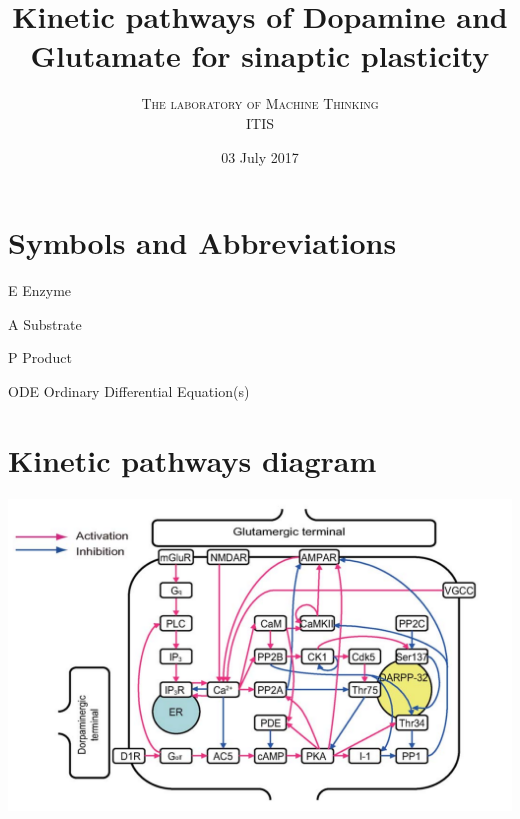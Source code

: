 \documentclass[twoside,twocolumn]{article}
\title{Kinetic pathways of Dopamine and Glutamate for sinaptic plasticity}
\author{
\textsc{The laboratory of Machine Thinking} \\[1ex]
\normalsize ITIS
}
\date{03 July 2017}
\begin{document}
\maketitle


\section{Symbols and Abbreviations}
\begin{strip}
\begin{abbrv}
\item[E]                   Enzyme
\item[A]                   Substrate
\item[P]                   Product
\item[ODE]                 Ordinary Differential Equation(s)
\end{abbrv}
\end{strip}

\section{Kinetic pathways diagram}


\begin{strip}
    \centering\noindent
    \includegraphics[width=\textwidth,natwidth=1132,natheight=701]{PathwaysDiagram.png}
\end{strip}
\end{document}
